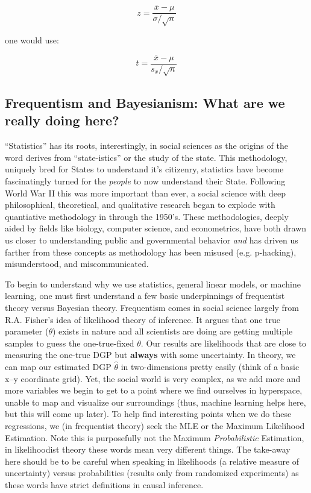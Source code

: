 \documentclass[12pt]{article}\usepackage[]{graphicx}\usepackage[]{color}
\begin{document}
\begin{flushleft}
\begin{equation}
z= \frac{\bar{x} - \mu}{\sigma / \sqrt{n}}
\end{equation}

\noindent one would use:

\begin{equation}
t = \frac{\bar{x} - \mu}{s_x / \sqrt{n}}
\end{equation}





\subsection{Frequentism and Bayesianism: What are we really doing here?}

``Statistics'' has its roots, interestingly, in social sciences as the origins of the word derives from ``state-istics'' or the study of the state. This methodology, uniquely bred for States to understand it's citizenry, statistics have become fascinatingly turned for the \textit{people} to now understand their State. Following World War II this was more important than ever, a social science with deep philosophical, theoretical, and qualitative research began to explode with quantiative methodology in through the 1950's. These methodologies, deeply aided by fields like biology, computer science, and econometrics, have both drawn us closer to understanding public and governmental behavior \textit{and} has driven us farther from these concepts as methodology has been misused (e.g. p-hacking), misunderstood, and miscommunicated.

To begin to understand why we use statistics, general linear models, or machine learning, one must first understand a few basic underpinnings of frequentist theory versus Bayesian theory. Frequentism comes in social science largely from R.A. Fisher's idea of likelihood theory of inference. It argues that one true parameter ($\theta$) exists in nature and all scientists are doing are getting multiple samples to guess the one-true-fixed $\theta$. Our results are likelihoods that are close to measuring the one-true DGP but \textbf{always} with some uncertainty. In theory, we can map our estimated DGP $\hat{\theta}$ in two-dimensions pretty easily (think of a basic x--y coordinate grid). Yet, the social world is very complex, as we add more and more variables we begin to get to a point where we find ourselves in hyperspace, unable to map and visualize our surroundings (thus, machine learning helps here, but this will come up later). To help find interesting points when we do these regressions, we (in frequentist theory) seek the MLE or the Maximum Likelihood Estimation. Note this is purposefully not the Maximum \textit{Probabilistic} Estimation, in likelihoodist theory these words mean very different things. The take-away here should be to be careful when speaking in likelihoods (a relative measure of uncertainty) versus probabilities (results only from randomized experiments) as these words have strict definitions in causal inference.


\end{flushleft}
\end{document}
